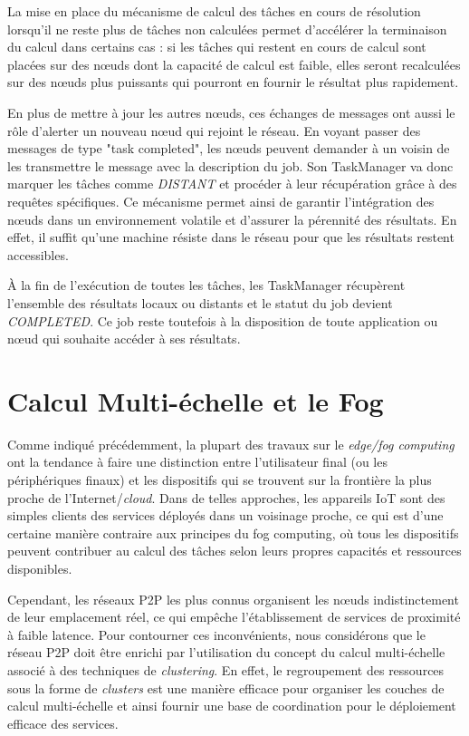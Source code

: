 La mise en place du mécanisme de calcul des tâches en cours de résolution lorsqu'il ne reste plus de tâches non calculées permet d’accélérer la terminaison du calcul dans certains cas : si les tâches qui restent en cours de calcul sont placées sur des n{\oe}uds dont la capacité de calcul est faible, elles seront recalculées sur des n{\oe}uds plus puissants qui pourront en fournir le résultat plus rapidement.

En plus de mettre à jour les autres n{\oe}uds, ces échanges de messages ont aussi le rôle d'alerter un nouveau n{\oe}ud qui rejoint le réseau. En voyant passer des messages de type "task completed", les n{\oe}uds peuvent demander à un voisin de les transmettre le message avec la description du job. Son TaskManager va donc marquer les tâches comme \textit{DISTANT} et procéder à leur récupération grâce à des requêtes spécifiques. Ce mécanisme permet ainsi de garantir l'intégration des n{\oe}uds dans un environnement volatile et d'assurer la pérennité des résultats. En effet, il suffit qu'une machine résiste dans le réseau pour que les résultats restent accessibles.

À la fin de l'exécution de toutes les tâches, les TaskManager récupèrent l'ensemble des résultats locaux ou distants et le statut du job devient \textit{COMPLETED}. Ce job reste toutefois à la disposition de toute application ou n{\oe}ud qui souhaite accéder à ses résultats.


\section{Calcul Multi-échelle et le Fog}

Comme indiqué précédemment, la plupart des travaux sur le \textit{edge/fog computing} ont la tendance à faire une distinction entre l'utilisateur final (ou les périphériques finaux) et les dispositifs qui se trouvent sur la frontière la plus proche de l'Internet/\textit{cloud}. Dans de telles approches, les appareils IoT sont des simples clients des services déployés dans un voisinage proche, ce qui est d'une certaine manière contraire aux principes du fog computing, où tous les dispositifs peuvent contribuer au calcul des tâches selon leurs propres capacités et ressources disponibles. 

Cependant, les réseaux P2P les plus connus organisent les n{\oe}uds indistinctement de leur emplacement réel, ce qui empêche l'établissement de services de proximité à faible latence. Pour contourner ces inconvénients, nous considérons que le réseau P2P doit être enrichi par l'utilisation du concept du calcul multi-échelle \cite{Rottenberg2012,Rottenberg2014}  associé à des techniques de \textit{clustering}. En effet, le regroupement des ressources sous la forme de \textit{clusters} est une manière efficace pour organiser les couches de calcul multi-échelle et ainsi fournir une base de coordination pour le déploiement efficace des services.


